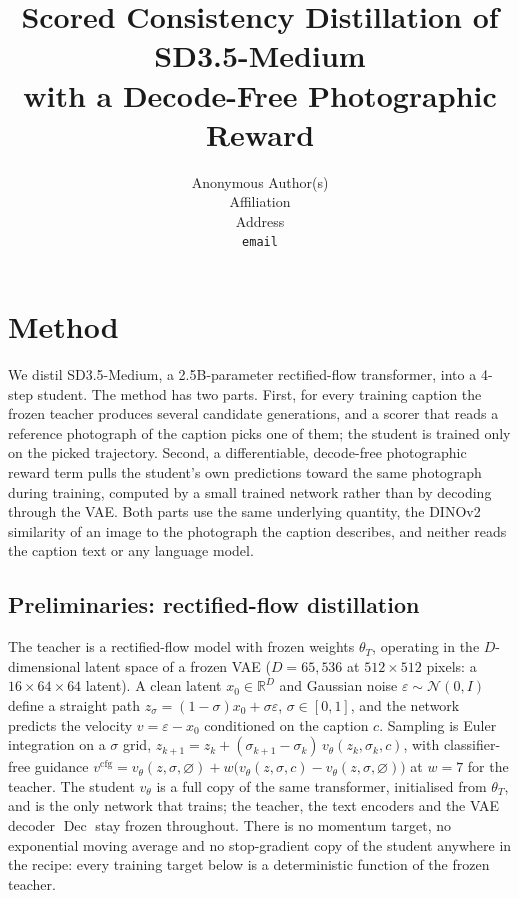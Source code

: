 \documentclass{article} %
\title{Scored Consistency Distillation of SD3.5-Medium\\with a Decode-Free Photographic Reward}
\author{Anonymous Author(s) \\ Affiliation \\ Address \\ \texttt{email}}
\DeclareMathOperator{\Dec}{Dec}
\begin{document}
\maketitle

\section{Method}
\label{sec:method}

We distil SD3.5-Medium, a 2.5B-parameter rectified-flow transformer, into a 4-step student. The
method has two parts. First, for every training caption the frozen teacher produces several
candidate generations, and a scorer that reads a reference photograph of the caption picks one of
them; the student is trained only on the picked trajectory. Second, a differentiable, decode-free
photographic reward term pulls the student's own predictions toward the same photograph during
training, computed by a small trained network rather than by decoding through the VAE. Both parts
use the same underlying quantity, the DINOv2 similarity of an image to the photograph the caption
describes, and neither reads the caption text or any language model.

\subsection{Preliminaries: rectified-flow distillation}
\label{sec:prelim}
The teacher is a rectified-flow model with frozen weights $\theta_T$, operating in the $D$-dimensional
latent space of a frozen VAE ($D{=}65{,}536$ at $512{\times}512$ pixels: a $16{\times}64{\times}64$
latent). A clean latent $x_0\in\mathbb R^D$ and
Gaussian noise $\varepsilon\sim\mathcal N(0,I)$ define a straight path $z_\sigma=(1-\sigma)x_0+\sigma\varepsilon$,
$\sigma\in[0,1]$, and the network predicts the velocity $v=\varepsilon-x_0$ conditioned on the
caption $c$. Sampling is Euler integration on a $\sigma$ grid, $z_{k+1}=z_k+(\sigma_{k+1}-\sigma_k)\,v_\theta(z_k,\sigma_k,c)$,
with classifier-free guidance $v^{\mathrm{cfg}}=v_\theta(z,\sigma,\varnothing)+w\big(v_\theta(z,\sigma,c)-v_\theta(z,\sigma,\varnothing)\big)$
at $w=7$ for the teacher. The student $v_\theta$ is a full copy of the same transformer, initialised
from $\theta_T$, and is the only network that trains; the teacher, the text encoders and the VAE
decoder $\Dec$ stay frozen throughout. There is no momentum target, no exponential moving average
and no stop-gradient copy of the student anywhere in the recipe: every training target below is a
deterministic function of the frozen teacher.
\end{document}
